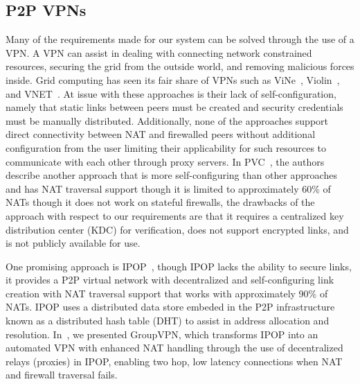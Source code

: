 \documentclass{sig-alternate}
\begin{document}
\subsection{P2P VPNs}
Many of the requirements made for our system can be solved through the use of a
VPN.  A VPN can assist in dealing with connecting network constrained resources,
securing the grid from the outside world, and removing malicious forces inside.
Grid computing has seen its fair share of VPNs such as ViNe~\cite{vine},
Violin~\cite{violin}, and VNET~\cite{vnet}.  At issue with these approaches is
their lack of self-configuration, namely that static links between peers must
be created and security credentials must be manually distributed.
Additionally, none of the approaches support direct connectivity between NAT
and firewalled peers without additional configuration from the user limiting
their applicability for such resources to communicate with each other through
proxy servers.  In PVC~\cite{pvc}, the authors describe another
approach that is more self-configuring than other approaches and has NAT
traversal support though it is limited to approximately 60\% of NATs though it
does not work on stateful firewalls, the drawbacks of the approach with respect
to our requirements are that it requires a centralized key distribution center
(KDC) for verification, does not support encrypted links, and is not publicly
available for use.

One promising approach is IPOP~\cite{ipop}, though IPOP lacks the ability to
secure links, it provides a P2P virtual network with decentralized and
self-configuring link creation with NAT traversal support that works with
approximately 90\% of NATs.  IPOP uses a distributed data store embeded in
the P2P infrastructure known as a distributed hash table (DHT) to assist in
address allocation and resolution.  In~\cite{nsdi10}, we presented GroupVPN,
which transforms IPOP into an automated VPN with enhanced NAT handling through
the use of decentralized relays (proxies) in IPOP, enabling two hop, low latency
connections when NAT and firewall traversal fails.
\end{document}
